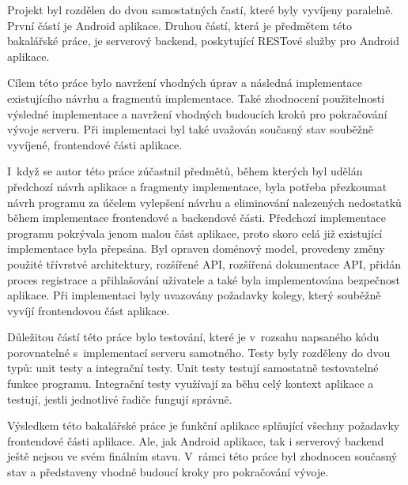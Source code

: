 Projekt byl rozdělen do dvou samostatných častí, které byly vyvíjeny paralelně. První částí je Android aplikace. Druhou částí, která je předmětem této bakalářské práce, je serverový backend, poskytující RESTové služby pro Android aplikace.

Cílem této práce bylo navržení vhodných úprav a následná implementace existujícího návrhu a fragmentů implementace. Také zhodnocení použitelnosti výsledné implementace a navržení vhodných budoucích kroků pro pokračování vývoje serveru. Při implementaci byl také uvažován současný stav souběžně vyvíjené, frontendové části aplikace.

I~když se autor této práce zúčastnil předmětů, během kterých byl udělán předchozí návrh aplikace a fragmenty implementace, byla potřeba přezkoumat návrh programu za účelem vylepšení návrhu a eliminování nalezených nedostatků během implementace frontendové a backendové části. Předchozí implementace programu pokrývala jenom malou část aplikace, proto skoro celá již existující implementace byla přepsána. Byl opraven doménový model, provedeny změny použité třívrstvé architektury, rozšířené API, rozšířená dokumentace API, přidán proces registrace a přihlašování uživatele a také byla implementována bezpečnost aplikace. Při implementaci byly uvazovány požadavky kolegy, který souběžně vyvíjí frontendovou část aplikace.

Důležitou částí této práce bylo testování, které je v~rozsahu napsaného kódu porovnatelné s~implementací serveru samotného. Testy byly rozděleny do dvou typů: unit testy a integrační testy. Unit testy testují samostatně testovatelné funkce programu. Integrační testy využívají za běhu celý kontext aplikace a testují, jestli jednotlivé řadiče fungují správně. 

Výsledkem této bakalářské práce je funkční aplikace splňující všechny požadavky frontendové části aplikace. Ale, jak Android aplikace, tak i serverový backend ještě nejsou ve svém finálním stavu. V~rámci této práce byl zhodnocen současný stav a představeny vhodné budoucí kroky pro pokračování vývoje.
